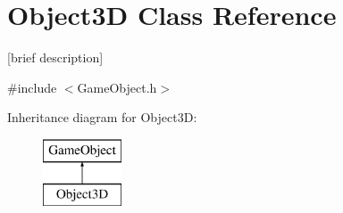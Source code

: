 \hypertarget{class_object3_d}{\section{Object3\-D Class Reference}
\label{class_object3_d}
}


\mbox{[}brief description\mbox{]}  




{\ttfamily \#include $<$Game\-Object.\-h$>$}

Inheritance diagram for Object3\-D\-:\begin{figure}[H]
\begin{center}
\leavevmode
\includegraphics[height=2.000000cm]{class_object3_d}
\end{center}
\end{figure}
